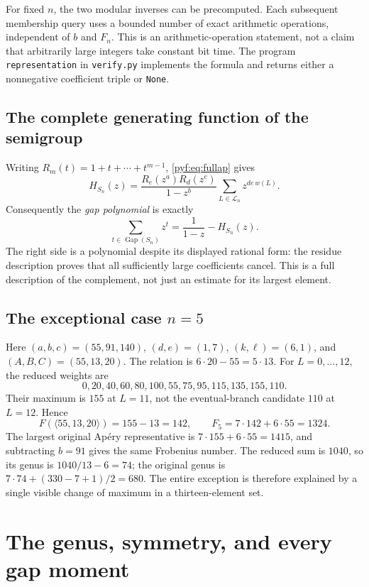 \documentclass[11pt,a4paper]{article}
\numberwithin{equation}{section}
\theoremstyle{definition}
\newcommand{\Gap}{\operatorname{Gap}}
\begin{document}
For fixed $n$, the two modular inverses can be precomputed. Each subsequent
membership query uses a bounded number of exact arithmetic operations,
independent of $b$ and $F_n$. This is an arithmetic-operation statement, not
a claim that arbitrarily large integers take constant bit time. The program
\texttt{representation} in \texttt{verify.py} implements the formula and
returns either a nonnegative coefficient triple or \texttt{None}.

\subsection{The complete generating function of the semigroup}

Writing $R_m(t)=1+t+\cdots+t^{m-1}$, \eqref{pyf:eq:fullap} gives
\begin{equation}\label{pyf:eq:fullhilbert}
H_{S_n}(z)=
\frac{R_e(z^a)R_d(z^c)}{1-z^b}
\sum_{L\in\mathcal L_n}z^{de\,w(L)}.
\end{equation}
Consequently the \emph{gap polynomial} is exactly
\begin{equation}\label{pyf:eq:gappoly}
\sum_{t\in\Gap(S_n)}z^t=\frac1{1-z}-H_{S_n}(z).
\end{equation}
The right side is a polynomial despite its displayed rational form: the
residue description proves that all sufficiently large coefficients cancel.
This is a full description of the complement, not just an estimate for its
largest element.

\subsection{The exceptional case \texorpdfstring{$n=5$}{n=5}}

Here $(a,b,c)=(55,91,140)$, $(d,e)=(1,7)$, $(k,\ell)=(6,1)$, and
$(A,B,C)=(55,13,20)$. The relation is $6\cdot20-55=5\cdot13$.
For $L=0,\ldots,12$, the reduced weights are
\[
0,20,40,60,80,100,55,75,95,115,135,155,110.
\]
Their maximum is $155$ at $L=11$, not the eventual-branch candidate
$110$ at $L=12$. Hence
\[
F(\langle55,13,20\rangle)=155-13=142,
\qquad F_5=7\cdot142+6\cdot55=1324.
\]
The largest original Ap\'ery representative is
$7\cdot155+6\cdot55=1415$, and subtracting $b=91$ gives the same
Frobenius number. The reduced sum is $1040$, so its genus is
$1040/13-6=74$; the original genus is
$7\cdot74+(330-7+1)/2=680$.
The entire exception is therefore explained by a single visible change of
maximum in a thirteen-element set.

\section{The genus, symmetry, and every gap moment}\label{pyf:sec:moments}
\end{document}
